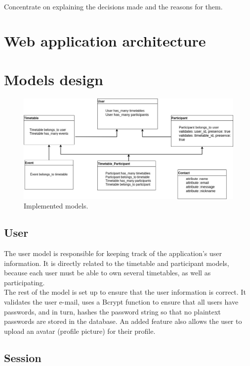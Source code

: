 Concentrate on explaining the decisions made and the reasons for them.
\section{Web application architecture}

\section{Models design}

\begin{figure}[H]
	\centering
    \includegraphics[trim={0 0 0 0},clip,width=1\textwidth]{Files/Models.jpg}
    \caption{Implemented models.}
    \label{fig: Models}
\end{figure}
\cite{draw:io}
\subsection{User}
The user model is responsible for keeping track of the application's user information. It is directly related to the timetable and participant models, because each user must be able to own several timetables, as well as participating.\\ 
The rest of the model is set up to ensure that the user information is correct. It validates the user e-mail, uses a Bcrypt function to ensure that all users have passwords, and in turn, hashes the password string so that no plaintext passwords are stored in the database. An added feature also allows the user to upload an avatar (profile picture) for their profile. \cite{wiki:RoR}

\subsection{Session}
